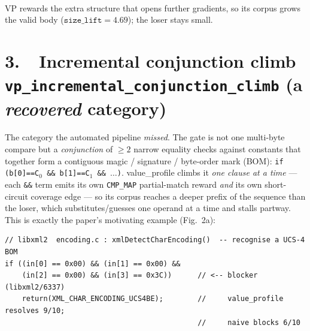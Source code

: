\documentclass[11pt]{article}
\begin{document}
\begin{center}
\\[-1pt]
{\footnotesize VP rewards the extra structure that opens further gradients, so its corpus grows the valid body ($\texttt{size\_lift}=4.69$); the loser stays small.}
\end{center}

\section*{3.\ \ Incremental conjunction climb \hfill {\normalsize\texttt{vp\_incremental\_conjunction\_climb} (a \emph{recovered} category)}}
The category the automated pipeline \emph{missed}. The gate is not one multi-byte
compare but a \emph{conjunction} of $\ge 2$ narrow equality checks against
constants that together form a contiguous magic / signature / byte-order mark
(BOM): \texttt{if (b[0]==C$_0$ \&\& b[1]==C$_1$ \&\& $\dots$)}. value\_profile
climbs it \emph{one clause at a time} --- each \texttt{\&\&} term emits its own
\texttt{CMP\_MAP} partial-match reward \emph{and} its own short-circuit coverage
edge --- so its corpus reaches a deeper prefix of the sequence than the loser,
which substitutes/guesses one operand at a time and stalls partway. This is
exactly the paper's motivating example (Fig.~2a):

\begin{lstlisting}[style=c]
// libxml2  encoding.c : xmlDetectCharEncoding()  -- recognise a UCS-4 BOM
if ((in[0] == 0x00) && (in[1] == 0x00) &&
    (in[2] == 0x00) && (in[3] == 0x3C))      // <-- blocker (libxml2/6337)
    return(XML_CHAR_ENCODING_UCS4BE);        //     value_profile resolves 9/10;
                                             //     naive blocks 6/10
\end{lstlisting}
\end{document}
